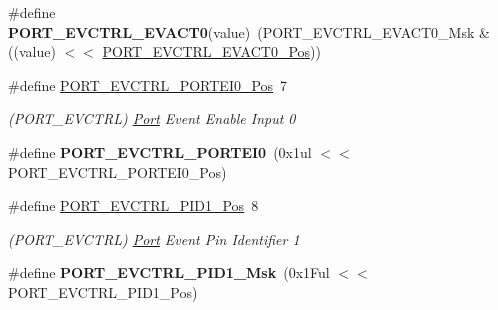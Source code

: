 \begin{DoxyCompactItemize}
\item 
\hypertarget{group___s_a_m_l21___p_o_r_t_ga77244fe5b6e46f5865bff89cc864e8af}{}\#define {\bfseries P\+O\+R\+T\+\_\+\+E\+V\+C\+T\+R\+L\+\_\+\+E\+V\+A\+C\+T0}(value)~(P\+O\+R\+T\+\_\+\+E\+V\+C\+T\+R\+L\+\_\+\+E\+V\+A\+C\+T0\+\_\+\+Msk \& ((value) $<$$<$ \hyperlink{group___s_a_m_l21___p_o_r_t_ga34e976f20ab7a82c517be8a4e6fe3ac8}{P\+O\+R\+T\+\_\+\+E\+V\+C\+T\+R\+L\+\_\+\+E\+V\+A\+C\+T0\+\_\+\+Pos}))\label{group___s_a_m_l21___p_o_r_t_ga77244fe5b6e46f5865bff89cc864e8af}

\item 
\hypertarget{group___s_a_m_l21___p_o_r_t_ga88f4bfafa9042b97077d13d5eaaac2af}{}\#define \hyperlink{group___s_a_m_l21___p_o_r_t_ga88f4bfafa9042b97077d13d5eaaac2af}{P\+O\+R\+T\+\_\+\+E\+V\+C\+T\+R\+L\+\_\+\+P\+O\+R\+T\+E\+I0\+\_\+\+Pos}~7\label{group___s_a_m_l21___p_o_r_t_ga88f4bfafa9042b97077d13d5eaaac2af}

\begin{DoxyCompactList}\small\item\em (P\+O\+R\+T\+\_\+\+E\+V\+C\+T\+R\+L) \hyperlink{struct_port}{Port} Event Enable Input 0 \end{DoxyCompactList}\item 
\hypertarget{group___s_a_m_l21___p_o_r_t_ga62af651d85d73dc4913ce9e77796d7dc}{}\#define {\bfseries P\+O\+R\+T\+\_\+\+E\+V\+C\+T\+R\+L\+\_\+\+P\+O\+R\+T\+E\+I0}~(0x1ul $<$$<$ P\+O\+R\+T\+\_\+\+E\+V\+C\+T\+R\+L\+\_\+\+P\+O\+R\+T\+E\+I0\+\_\+\+Pos)\label{group___s_a_m_l21___p_o_r_t_ga62af651d85d73dc4913ce9e77796d7dc}

\item 
\hypertarget{group___s_a_m_l21___p_o_r_t_ga3b4c736f727d87be5bd9343cba9d3cd4}{}\#define \hyperlink{group___s_a_m_l21___p_o_r_t_ga3b4c736f727d87be5bd9343cba9d3cd4}{P\+O\+R\+T\+\_\+\+E\+V\+C\+T\+R\+L\+\_\+\+P\+I\+D1\+\_\+\+Pos}~8\label{group___s_a_m_l21___p_o_r_t_ga3b4c736f727d87be5bd9343cba9d3cd4}

\begin{DoxyCompactList}\small\item\em (P\+O\+R\+T\+\_\+\+E\+V\+C\+T\+R\+L) \hyperlink{struct_port}{Port} Event Pin Identifier 1 \end{DoxyCompactList}\item 
\hypertarget{group___s_a_m_l21___p_o_r_t_ga176c1ebe1a3a4dd2bea6069c6490387b}{}\#define {\bfseries P\+O\+R\+T\+\_\+\+E\+V\+C\+T\+R\+L\+\_\+\+P\+I\+D1\+\_\+\+Msk}~(0x1\+Ful $<$$<$ P\+O\+R\+T\+\_\+\+E\+V\+C\+T\+R\+L\+\_\+\+P\+I\+D1\+\_\+\+Pos)\label{group___s_a_m_l21___p_o_r_t_ga176c1ebe1a3a4dd2bea6069c6490387b}


\end{DoxyCompactItemize}
